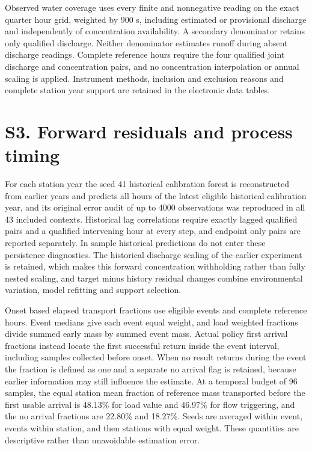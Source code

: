 \documentclass[lineno,pdflatex,sn-apa]{sn-jnl}%
\theoremstyle{thmstyleone}%
\theoremstyle{thmstyletwo}%
\theoremstyle{thmstylethree}%
\begin{document}
Observed water coverage uses every finite and nonnegative reading on the exact quarter hour grid, weighted by 900 s, including estimated or provisional discharge and independently of concentration availability. A secondary denominator retains only qualified discharge. Neither denominator estimates runoff during absent discharge readings. Complete reference hours require the four qualified joint discharge and concentration pairs, and no concentration interpolation or annual scaling is applied. Instrument methods, inclusion and exclusion reasons and complete station year support are retained in the electronic data tables.

\section*{S3. Forward residuals and process timing}

For each station year the seed 41 historical calibration forest is reconstructed from earlier years and predicts all hours of the latest eligible historical calibration year, and its original error audit of up to 4000 observations was reproduced in all 43 included contexts. Historical lag correlations require exactly lagged qualified pairs and a qualified intervening hour at every step, and endpoint only pairs are reported separately. In sample historical predictions do not enter these persistence diagnostics. The historical discharge scaling of the earlier experiment is retained, which makes this forward concentration withholding rather than fully nested scaling, and target minus history residual changes combine environmental variation, model refitting and support selection.

Onset based elapsed transport fractions use eligible events and complete reference hours. Event medians give each event equal weight, and load weighted fractions divide summed early mass by summed event mass. Actual policy first arrival fractions instead locate the first successful return inside the event interval, including samples collected before onset. When no result returns during the event the fraction is defined as one and a separate no arrival flag is retained, because earlier information may still influence the estimate. At a temporal budget of 96 samples, the equal station mean fraction of reference mass transported before the first usable arrival is 48.13\% for load value and 46.97\% for flow triggering, and the no arrival fractions are 22.80\% and 18.27\%. Seeds are averaged within event, events within station, and then stations with equal weight. These quantities are descriptive rather than unavoidable estimation error.
\end{document}
